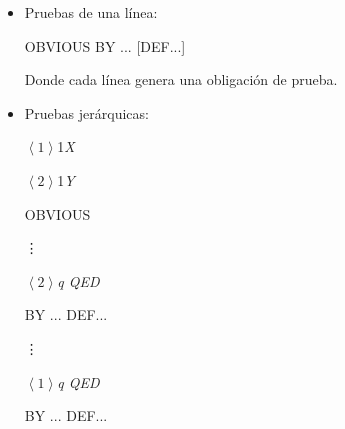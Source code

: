 \begin{itemize}
   \item Pruebas de una línea:
    
      \subitem OBVIOUS
      \subitem BY ... [DEF...]
    
    Donde cada línea genera una obligación de prueba.
    \\
   \item Pruebas jerárquicas:
   
      $\left\langle1\right\rangle$1\textit{X}
      
      \hspace{0.5cm}$\left\langle2\right\rangle$1\textit{Y}
      
      \hspace{1cm}OBVIOUS
      
      \hspace{0.5cm}\vdots
      
      \hspace{0.5cm}$\left\langle2\right\rangle$\textit{q QED}
      
      \hspace{1cm} BY ... DEF...
      
      \hspace{0.1cm}\vdots
      
      $\left\langle1\right\rangle$\textit{q QED}
      
      \hspace{0.5cm}BY ... DEF...
\end{itemize}